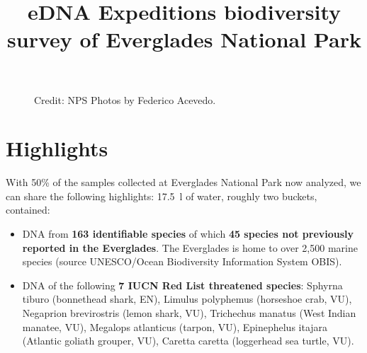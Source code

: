 \documentclass[10pt]{article}
\date{}
\title{eDNA Expeditions biodiversity survey of Everglades National Park}
\author
\begin{document}
\maketitle

\begin{figure}[h]
 	\centering
 	\caption*{Credit: NPS Photos by Federico Acevedo.}
\end{figure}

\section*{Highlights}

With 50\% of the samples collected at Everglades National Park now analyzed, we can share the following highlights: \SI{17.5}{\litre} of water, roughly two buckets, contained:

\begin{itemize}
\item DNA from \textbf{163 identifiable species} of which \textbf{45 species not previously reported in the Everglades}. The Everglades is home to over 2,500 marine species (source UNESCO/Ocean Biodiversity Information System OBIS).
\item DNA of the following \textbf{7 IUCN Red List threatened species}: Sphyrna tiburo (bonnethead shark, EN), Limulus polyphemus (horseshoe crab, VU), Negaprion brevirostris (lemon shark, VU), Trichechus manatus (West Indian manatee, VU), Megalops atlanticus (tarpon, VU), Epinephelus itajara (Atlantic goliath grouper, VU), Caretta caretta (loggerhead sea turtle, VU).
\end{itemize}
\end{document}
